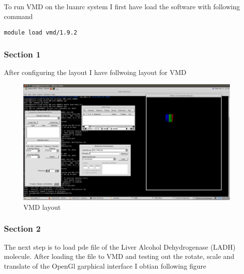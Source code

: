 \documentclass[11pt]{article}
\makeatletter
\def\maxwidth{\ifdim\Gin@nat@width>\linewidth\linewidth
    \else\Gin@nat@width\fi}
\let\Oldincludegraphics\includegraphics
\renewcommand{\includegraphics}[1]{\Oldincludegraphics[width=.8\maxwidth]{#1}}
\makeatother
\begin{document}
To run VMD on the luanrc system I first have load the software with
following command

\begin{verbatim}
module load vmd/1.9.2
\end{verbatim}

\subsubsection{Section 1}\label{section-1}

After configuring the layout I have follwoing layout for VMD

\begin{figure}
\centering
\includegraphics{Screenshot_vmd_setup.png}
\caption{VMD layout}
\end{figure}

\subsubsection{Section 2}\label{section-2}

The next step is to load pde file of the Liver Alcohol Dehydrogenase
(LADH) molecule. After loading the file to VMD and testing out the
rotate, scale and translate of the OpenGl garphical interface I obtian
following figure
\end{document}
